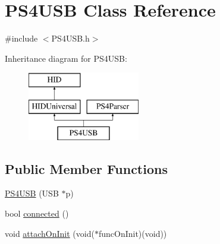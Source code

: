 \hypertarget{class_p_s4_u_s_b}{\section{\-P\-S4\-U\-S\-B \-Class \-Reference}
\label{class_p_s4_u_s_b}
}


{\ttfamily \#include $<$\-P\-S4\-U\-S\-B.\-h$>$}

\-Inheritance diagram for \-P\-S4\-U\-S\-B\-:\begin{figure}[H]
\begin{center}
\leavevmode
\includegraphics[height=3.000000cm]{class_p_s4_u_s_b}
\end{center}
\end{figure}
\subsection*{\-Public \-Member \-Functions}
\begin{DoxyCompactItemize}
\item 
\hyperlink{class_p_s4_u_s_b_a1ace884e418a0b8fe0f37bba7ea240e7}{\-P\-S4\-U\-S\-B} (\-U\-S\-B $\ast$p)
\item 
bool \hyperlink{class_p_s4_u_s_b_a3dd2b4e19516fb76d9442937102ea97f}{connected} ()
\item 
void \hyperlink{class_p_s4_u_s_b_abe78ea9b765b11c08b060f923ae9d8cd}{attach\-On\-Init} (void($\ast$func\-On\-Init)(void))
\end{DoxyCompactItemize}
